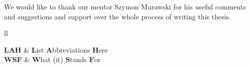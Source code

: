 \documentclass[
    11pt,
    english, %
    singlespacing, %
    headsepline, %
    oneside, %
]{MastersDoctoralThesis} %
\begin{document}

    \begin{acknowledgements}
        \addchaptertocentry{\acknowledgementname} %
        We would like to thank our mentor Szymon Murawski for his useful comments and suggestions and support
        over the whole process of writing this thesis.
    \end{acknowledgements}


    \tableofcontents %
%
%


    \begin{abbreviations}{ll} %

        \textbf{LAH} & \textbf{L}ist \textbf{A}bbreviations \textbf{H}ere\\
        \textbf{WSF} & \textbf{W}hat (it) \textbf{S}tands \textbf{F}or\\

    \end{abbreviations}


%
%
%
\end{document}
